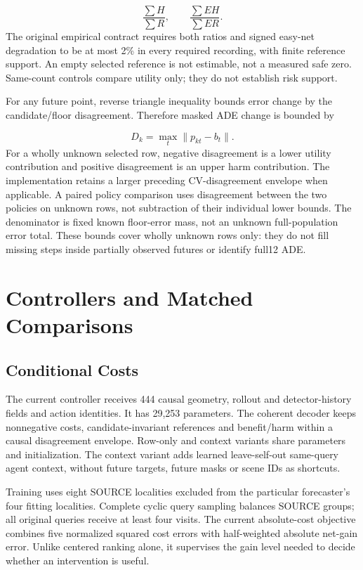 \documentclass[10pt,twocolumn,letterpaper]{article}
\begin{document}
\begin{equation}
\frac{\sum H}{\sum R},\qquad \frac{\sum EH}{\sum ER}.
\end{equation}
The original empirical contract requires both ratios and signed easy-net
degradation to be at most 2\% in every required recording, with finite reference
support. An empty selected reference is not estimable, not a measured safe zero.
Same-count controls compare utility only; they do not establish risk support.

For any future point, reverse triangle inequality bounds error change by the
candidate/floor disagreement. Therefore masked ADE change is bounded by

\begin{equation}
D_k=\max_t\|p_{kt}-b_t\|.
\end{equation}
For a wholly unknown selected row, negative disagreement is a lower utility
contribution and positive disagreement is an upper harm contribution. The
implementation retains a larger preceding CV-disagreement envelope when
applicable. A paired policy comparison uses disagreement between the two
policies on unknown rows, not subtraction of their individual lower bounds.
The denominator is fixed known floor-error mass, not an unknown full-population
error total. These bounds cover wholly unknown rows only: they do not fill
missing steps inside partially observed futures or identify full12 ADE.

\section{Controllers and Matched Comparisons}
\subsection{Conditional Costs}
The current controller receives 444 causal geometry, rollout and detector-history
fields and action identities. It has 29,253 parameters. The coherent decoder
keeps nonnegative costs, candidate-invariant references and benefit/harm within
a causal disagreement envelope. Row-only and context variants share parameters
and initialization. The context variant adds learned leave-self-out same-query
agent context, without future targets, future masks or scene IDs as shortcuts.

Training uses eight SOURCE localities excluded from the particular forecaster's
four fitting localities. Complete cyclic query sampling balances SOURCE groups;
all original queries receive at least four visits. The current absolute-cost
objective combines five normalized squared cost errors with half-weighted
absolute net-gain error. Unlike centered ranking alone, it supervises the gain
level needed to decide whether an intervention is useful.
\end{document}
